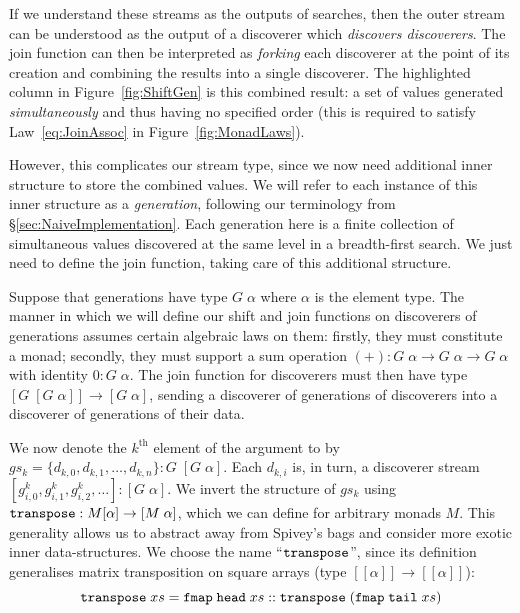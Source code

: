 If we understand these streams as the outputs of searches, then the outer stream can be understood as the output of a discoverer which \emph{discovers discoverers}. The join function can then be interpreted as \emph{forking} each discoverer at the point of its creation and combining the results into a single discoverer. The highlighted column in Figure~\ref{fig:ShiftGen} is this combined result: a set of values generated \emph{simultaneously} and thus having no specified order (this is required to satisfy Law~\ref{eq:JoinAssoc} in Figure~\ref{fig:MonadLaws}).

However, this complicates our stream type, since we now need additional inner structure to store the combined values. We will refer to each instance of this inner structure as a \emph{generation}, following our terminology from \S\ref{sec:NaiveImplementation}. Each generation here is a finite collection of simultaneous values discovered at the same level in a breadth-first search. We just need to define the join function, taking care of this additional structure.

Suppose that generations have type $G\;\alpha$ where $\alpha$ is the element type. The manner in which we will define our shift and join functions on discoverers of generations assumes certain algebraic laws on them: firstly, they must constitute a monad; secondly, they must support a sum operation \mbox{$(+):G\;\alpha\rightarrow G\;\alpha\rightarrow G\;\alpha$} with identity $0:G\;\alpha$. The join function for discoverers must then have type $[G\;[G\;\alpha]] \rightarrow [G\;\alpha]$, sending a discoverer of generations of discoverers into a discoverer of generations of their data. 

We now denote the $k^{\text{th}}$ element of the argument to  by $gs_k = \{d_{k,0}, d_{k,1}, \ldots, d_{k,n}\} : G\;[G\;\alpha] $. Each $d_{k,i}$ is, in turn, a discoverer stream $[g^k_{i,0}, g^k_{i,1}, g^k_{i,2}, \ldots] : [G\;\alpha]$. We invert the structure of $gs_k$ using $\texttt{transpose}  : M[\alpha]\rightarrow [M\;\alpha]$, which we can define for arbitrary monads $M$. This generality allows us to abstract away from Spivey's bags and consider more exotic inner data-structures. We choose the name ``$\texttt{transpose}$'', since its definition generalises matrix transposition on square arrays (type $[[\alpha]]\rightarrow[[\alpha]]$):
\begin{displaymath}
\texttt{transpose}\;xs = \texttt{fmap}\;\texttt{head}\;xs :: \texttt{transpose}\; (\texttt{fmap}\;\texttt{tail}\;xs)
\end{displaymath}

